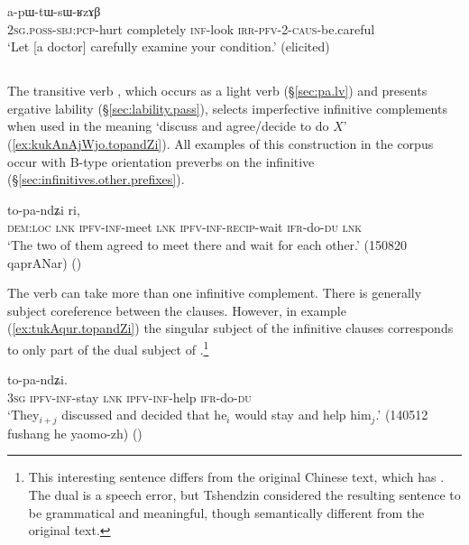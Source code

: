 \begin{exe} 
\ex \label{ex:kArtoR.apWtWsWRzAB}
 a-pɯ-tɯ-sɯ-ʁzɤβ \\
\textsc{2sg}.\textsc{poss}-\textsc{sbj}:\textsc{pcp}-hurt completely \textsc{inf}-look \textsc{irr}-\textsc{pfv}-2-\textsc{caus}-be.careful \\
\glt `Let [a doctor] carefully examine your condition.' (elicited)
\end{exe} 


\subsection{} \label{sec:pa.complements}
The transitive verb , which occurs as a light verb (§\ref{sec:pa.lv}) and presents ergative lability (§\ref{sec:lability.pass}), selects imperfective infinitive complements when used in the meaning `discuss and agree/decide to do $X$' (\ref{ex:kukAnAjWjo.topandZi}). All examples of this construction in the corpus occur with B-type orientation preverbs on the infinitive (§\ref{sec:infinitives.other.prefixes}). 

\begin{exe}
\ex \label{ex:kukAnAjWjo.topandZi}
 to-pa-ndʑi ri, \\
  \textsc{dem}:\textsc{loc} \textsc{lnk} \textsc{ipfv}-\textsc{inf}-meet \textsc{lnk} \textsc{ipfv}-\textsc{inf}-\textsc{recip}-wait \textsc{ifr}-do-\textsc{du} \textsc{lnk} \\
\glt `The two of them agreed to meet there and wait for each other.' (150820 qaprANar)
()
 \end{exe}
 
The verb  can take more than one infinitive complement. There is generally subject coreference between the clauses. However, in example (\ref{ex:tukAqur.topandZi}) the singular subject of the infinitive clauses corresponds to only part of the dual subject of .\footnote{This interesting sentence differs from the original Chinese text, which has . The dual  is a speech error, but Tshendzin considered the resulting sentence to be grammatical and meaningful, though semantically different from the original text. }

\begin{exe}
\ex \label{ex:tukAqur.topandZi}
 to-pa-ndʑi. \\
\textsc{3sg} \textsc{ipfv}-\textsc{inf}-stay \textsc{lnk} \textsc{ipfv}-\textsc{inf}-help \textsc{ifr}-do-\textsc{du} \\
\glt `They$_{i+j}$ discussed and decided that he$_i$ would stay and help him$_j$.' (140512 fushang he yaomo-zh)
()
\end{exe}

